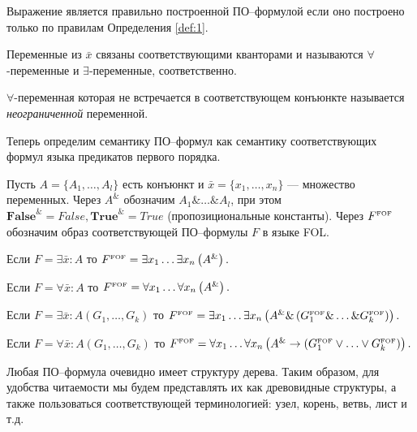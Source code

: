 Выражение является правильно построенной ПО--формулой если оно построено только по правилам Определения \ref{def:1}.

Переменные из $\bar{x}$ связаны соответствующими кванторами и называются $\forall$-переменные и $\exists$-переменные, соответственно.

$\forall$-переменная которая не встречается в соответствующем конъюнкте называется {\em неограниченной} переменной.

Теперь определим семантику ПО--формул как семантику соответствующих формул языка предикатов первого порядка.

\begin{definition}\label{def:semantic}
Пусть $A = \{A_1,\ldots,A_l\}$ есть конъюнкт и $\bar{x} = \{x_1,\ldots,x_n\}$ --- множество переменных. Через $A^{\&}$ обозначим $A_1 \&\ldots\&A_l$, при этом $\boldsymbol{False}^{\&}= False, \boldsymbol{True}^{\&}=True$ (пропозициональные константы). Через $F^{\text{\tiny{FOF}}}$ обозначим образ соответствующей ПО--формулы $F$ в языке FOL.

Если $F= \exists \bar{x}\colon A$ то $F^{\text{\tiny{FOF}}} = \exists x_1 \ldots \exists x_n \left(A^{\&}\right).$

Если $F = \forall \bar{x}\colon A$ то $F^{\text{\tiny{FOF}}} = \forall x_1 \ldots \forall x_n \left(A^{\&}\right).$

Если $F = \exists \bar{x}\colon A\left(G_1,\ldots,G_k\right)$ то $F^{\text{\tiny{FOF}}} = \exists x_1 \ldots \exists x_n  \left(A^{\&} \& \left(G_{1}^{\text{\tiny{FOF}}} \& \ldots \& G_{k}^{\text{\tiny{FOF}}}\right)\right).$

Если $F = \forall \bar{x}\colon A\left(G_1,\ldots,G_k\right)$ то $F^{\text{\tiny{FOF}}} = \forall x_1 \ldots \forall x_n \left(A^{\&}\rightarrow \left(G_{1}^{\text{\tiny{FOF}}} \vee\ldots\vee G_{k}^{\text{\tiny{FOF}}}\right)\right).$

\end{definition}

Любая ПО--формула очевидно имеет структуру дерева. Таким образом, для удобства читаемости мы будем представлять их как древовидные структуры, а также пользоваться соответствующей терминологией: узел, корень, ветвь, лист и т.д.


